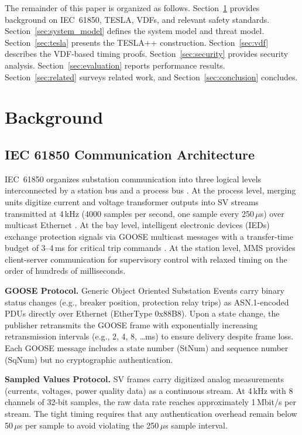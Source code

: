 \documentclass[conference,10pt]{IEEEtran}
\newcommand{\GOOSE}{\textsf{GOOSE}}
\newcommand{\SV}{\textsf{SV}}
\newcommand{\MMS}{\textsf{MMS}}
\begin{document}
The remainder of this paper is organized as follows. Section~\ref{sec:background} provides background on IEC~61850, TESLA, VDFs, and relevant safety standards. Section~\ref{sec:system_model} defines the system model and threat model. Section~\ref{sec:tesla} presents the TESLA++ construction. Section~\ref{sec:vdf} describes the VDF-based timing proofs. Section~\ref{sec:security} provides security analysis. Section~\ref{sec:evaluation} reports performance results. Section~\ref{sec:related} surveys related work, and Section~\ref{sec:conclusion} concludes.

\section{Background}
\label{sec:background}

\subsection{IEC 61850 Communication Architecture}

IEC~61850 organizes substation communication into three logical levels interconnected by a station bus and a process bus \cite{iec61850-1}. At the process level, merging units digitize current and voltage transformer outputs into \SV{} streams transmitted at 4\,kHz (4000 samples per second, one sample every 250\,$\mu$s) over multicast Ethernet \cite{iec61850-9-2}. At the bay level, intelligent electronic devices (IEDs) exchange protection signals via \GOOSE{} multicast messages with a transfer-time budget of 3--4\,ms for critical trip commands \cite{iec61850-8-1}. At the station level, \MMS{} provides client-server communication for supervisory control with relaxed timing on the order of hundreds of milliseconds.

\textbf{GOOSE Protocol.} Generic Object Oriented Substation Events carry binary status changes (e.g., breaker position, protection relay trips) as ASN.1-encoded PDUs directly over Ethernet (EtherType 0x88B8). Upon a state change, the publisher retransmits the GOOSE frame with exponentially increasing retransmission intervals (e.g., 2, 4, 8, \ldots ms) to ensure delivery despite frame loss. Each GOOSE message includes a state number (StNum) and sequence number (SqNum) but no cryptographic authentication.

\textbf{Sampled Values Protocol.} \SV{} frames carry digitized analog measurements (currents, voltages, power quality data) as a continuous stream. At 4\,kHz with 8 channels of 32-bit samples, the raw data rate reaches approximately 1\,Mbit/s per stream. The tight timing requires that any authentication overhead remain below 50\,$\mu$s per sample to avoid violating the 250\,$\mu$s sample interval.
\end{document}
